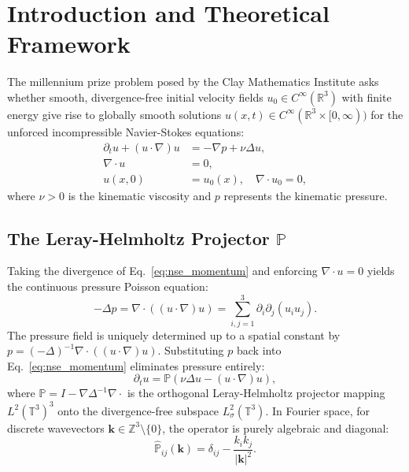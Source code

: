 \documentclass[10pt,a4paper,twocolumn]{article}
\theoremstyle{definition}
\begin{document}
\section{Introduction and Theoretical Framework}

The millennium prize problem posed by the Clay Mathematics Institute asks whether smooth, divergence-free initial velocity fields $u_0 \in C^\infty(\mathbb{R}^3)$ with finite energy give rise to globally smooth solutions $u(x, t) \in C^\infty(\mathbb{R}^3 \times [0, \infty))$ for the unforced incompressible Navier-Stokes equations:
\begin{align}
\partial_t u + (u \cdot \nabla) u &= -\nabla p + \nu \Delta u, \label{eq:nse_momentum} \\
\nabla \cdot u &= 0, \label{eq:nse_incomp} \\
u(x, 0) &= u_0(x), \quad \nabla \cdot u_0 = 0, \label{eq:nse_ic}
\end{align}
where $\nu > 0$ is the kinematic viscosity and $p$ represents the kinematic pressure.

\subsection{The Leray-Helmholtz Projector $\mathbb{P}$}
Taking the divergence of Eq.~\eqref{eq:nse_momentum} and enforcing $\nabla \cdot u = 0$ yields the continuous pressure Poisson equation:
\begin{equation}
-\Delta p = \nabla \cdot ((u \cdot \nabla) u) = \sum_{i,j=1}^3 \partial_i \partial_j (u_i u_j).
\label{eq:poisson_cont}
\end{equation}
The pressure field is uniquely determined up to a spatial constant by $p = (-\Delta)^{-1} \nabla \cdot ((u \cdot \nabla) u)$. Substituting $p$ back into Eq.~\eqref{eq:nse_momentum} eliminates pressure entirely:
\begin{equation}
\partial_t u = \mathbb{P} \left( \nu \Delta u - (u \cdot \nabla) u \right),
\label{eq:leray_form}
\end{equation}
where $\mathbb{P} = I - \nabla \Delta^{-1} \nabla \cdot$ is the orthogonal Leray-Helmholtz projector mapping $L^2(\mathbb{T}^3)^3$ onto the divergence-free subspace $L_\sigma^2(\mathbb{T}^3)$. In Fourier space, for discrete wavevectors $\mathbf{k} \in \mathbb{Z}^3 \setminus \{0\}$, the operator is purely algebraic and diagonal:
\begin{equation}
\widehat{\mathbb{P}}_{ij}(\mathbf{k}) = \delta_{ij} - \frac{k_i k_j}{|\mathbf{k}|^2}.
\label{eq:leray_fourier}
\end{equation}
\end{document}
